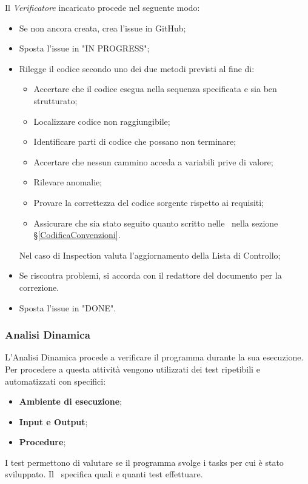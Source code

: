 \label{VerificaCodice}
Il \textit{Verificatore} incaricato procede nel seguente modo:
\begin{itemize}
	\item Se non ancora creata, crea l'issue in GitHub;
	\item Sposta l'issue in "IN PROGRESS";
	\item Rilegge il codice secondo uno dei due metodi previsti al fine di:
	\begin{itemize}
		\item Accertare che il codice esegua nella sequenza specificata e sia ben strutturato;
		\item Localizzare codice non raggiungibile;
		\item Identificare parti di codice che possano non terminare;
		\item Accertare che nessun cammino acceda a variabili prive di valore;
		\item Rilevare anomalie;
		\item Provare la correttezza del codice sorgente rispetto ai requisiti;
		\item Assicurare che sia stato seguito quanto scritto nelle \NdPv{}\ nella sezione \S\ref{CodificaConvenzioni}.
	\end{itemize}
	 Nel caso di Inspection valuta l'aggiornamento della Lista di Controllo;
	\item Se riscontra problemi, si accorda con il redattore del documento per la correzione. 
	\item Sposta l'issue in "DONE".
\end{itemize}

\subsubsection{Analisi Dinamica}
L'Analisi Dinamica procede a verificare il programma durante la sua esecuzione. Per procedere a questa attività vengono utilizzati dei test ripetibili e automatizzati con specifici:
\begin{itemize}
	\item \textbf{Ambiente di esecuzione};
	\item \textbf{Input e Output};
	\item \textbf{Procedure};
\end{itemize}

\label{Tests}
I test permettono di valutare se il programma svolge i tasks per cui è stato sviluppato. Il \PdQv{}\ specifica quali e quanti test effettuare.
